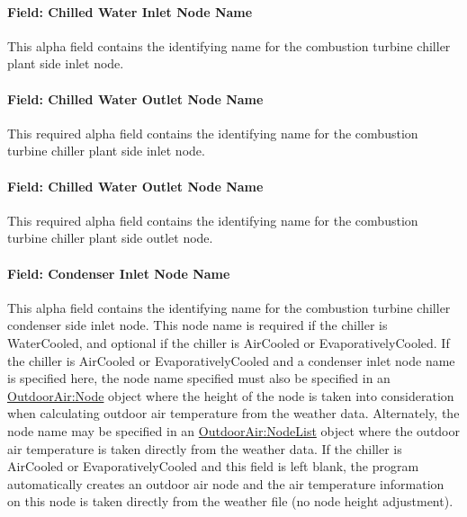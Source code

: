 \paragraph{Field: Chilled Water Inlet Node Name}\label{field-chilled-water-inlet-node-name-6}

This alpha field contains the identifying name for the combustion turbine chiller plant side inlet node.

\paragraph{Field: Chilled Water Outlet Node Name}\label{field-chilled-water-outlet-node-name-6}

This required alpha field contains the identifying name for the combustion turbine chiller plant side inlet node.

\paragraph{Field: Chilled Water Outlet Node Name}\label{field-chilled-water-outlet-node-name-7}

This required alpha field contains the identifying name for the combustion turbine chiller plant side outlet node.

\paragraph{Field: Condenser Inlet Node Name}\label{field-condenser-inlet-node-name-6}

This alpha field contains the identifying name for the combustion turbine chiller condenser side inlet node. This node name is required if the chiller is WaterCooled, and optional if the chiller is AirCooled or EvaporativelyCooled. If the chiller is AirCooled or EvaporativelyCooled and a condenser inlet node name is specified here, the node name specified must also be specified in an \hyperref[outdoorairnode]{OutdoorAir:Node} object where the height of the node is taken into consideration when calculating outdoor air temperature from the weather data. Alternately, the node name may be specified in an \hyperref[outdoorairnodelist]{OutdoorAir:NodeList} object where the outdoor air temperature is taken directly from the weather data. If the chiller is AirCooled or EvaporativelyCooled and this field is left blank, the program automatically creates an outdoor air node and the air temperature information on this node is taken directly from the weather file (no node height adjustment).

